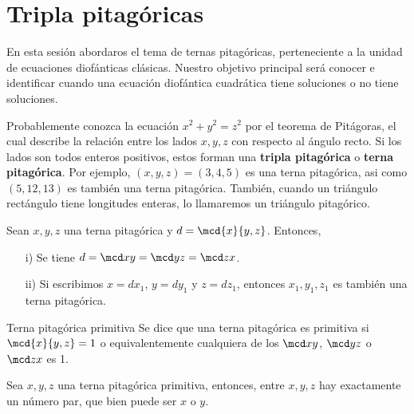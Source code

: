 \section{Tripla pitagóricas}

En esta sesión abordaros el tema de ternas pitagóricas, perteneciente a la unidad de ecuaciones diofánticas clásicas.
Nuestro objetivo principal será conocer e identificar cuando una ecuación diofántica cuadrática tiene soluciones o no tiene soluciones.

Probablemente conozca la ecuación $x^2 + y^2 = z^2$ por el teorema de Pitágoras, el cual describe la relación entre los lados $x,y,z$ con respecto al ángulo recto.
Si los lados son todos enteros positivos, estos forman una \textbf{tripla pitagórica} o \textbf{terna pitagórica}.
Por ejemplo, $(x,y,z) = (3,4,5)$ es una terna pitagórica, asi como $(5,12,13)$ es también una terna pitagórica.
También, cuando un triángulo rectángulo tiene longitudes enteras, lo llamaremos un triángulo pitagórico.

\begin{lemma}
    Sean $x,y,z$ una terna pitagórica y $d = \mcd{x}{y,z}$.
    Entonces,
    \begin{enumerate}
        \item [i)] Se tiene $d = \mcd x y = \mcd y z = \mcd z x$.
        \item [ii)] Si escribimos $x = d x_1$, $y = d y_1$ y $z = d z_1$, entonces $x_1, y_1, z_1$ es también una terna pitagórica.
    \end{enumerate}
\end{lemma}

\begin{definition.box}{Terna pitagórica primitiva}{}
    Se dice que una terna pitagórica es primitiva si $\mcd{x}{y,z} = 1$ o equivalentemente cualquiera de los $\mcd x y$, $\mcd y z$ o $\mcd z x$ es 1.
\end{definition.box}

\begin{lemma}
    Sea $x,y,z$ una terna pitagórica primitiva, entonces, entre $x,y,z$ hay exactamente un número par, que bien puede ser $x$ o $y$.
\end{lemma}

